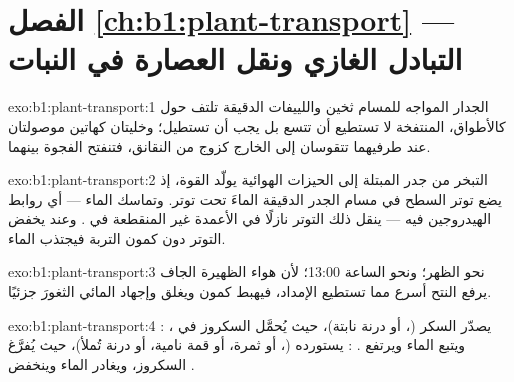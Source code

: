 \section*{الفصل \ref{ch:b1:plant-transport} --- التبادل الغازي ونقل العصارة في النبات}

\begin{solution}{exo:b1:plant-transport:1}
الجدار المواجه للمسام ثخين واللييفات الدقيقة تلتف حول 
كالأطواق،  المنتفخة لا تستطيع أن تتسع بل يجب أن تستطيل؛
وخليتان كهاتين موصولتان عند طرفيهما تتقوسان إلى الخارج كزوج من
النقانق، فتنفتح الفجوة بينهما.
\end{solution}

\begin{solution}{exo:b1:plant-transport:2}
التبخر من جدر   المبتلة إلى الحيزات الهوائية يولّد
القوة، إذ يضع توتر السطح في مسام الجدر الدقيقة الماءَ تحت توتر.
وتماسك الماء --- أي روابط الهيدروجين فيه --- ينقل ذلك التوتر نازلًا
في الأعمدة غير المنقطعة في . وعند  يخفض التوتر   دون كمون التربة فيجتذب الماء.
\end{solution}

\begin{solution}{exo:b1:plant-transport:3}
نحو الظهر؛ ونحو الساعة 13:00؛ لأن هواء الظهيرة الجاف يرفع النتح
أسرع مما تستطيع  الإمداد، فيهبط كمون  ويغلق  وإجهاد  المائي الثغورَ جزئيًا.
\end{solution}

\begin{solution}{exo:b1:plant-transport:4}
:  يصدّر السكر (، أو درنة نابتة)، حيث يُحمَّل السكروز
في ، ويتبع الماء ويرتفع . : 
يستورده (، أو ثمرة، أو قمة نامية، أو درنة تُملأ)، حيث يُفرَّغ
السكروز، ويغادر الماء وينخفض .
\end{solution}

